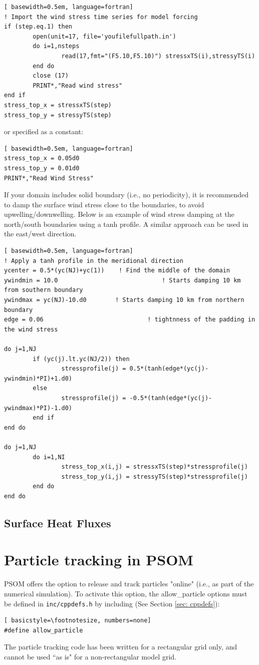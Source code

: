 \documentclass[12pt,letterpaper,titlepage]{article}
\begin{document}
\begin{lstlisting}[	basewidth=0.5em, language=fortran]
! Import the wind stress time series for model forcing
if (step.eq.1) then
		open(unit=17, file='youfilefullpath.in')
		do i=1,nsteps
				read(17,fmt="(F5.10,F5.10)") stressxTS(i),stressyTS(i)
		end do
		close (17)
		PRINT*,"Read wind stress"
end if
stress_top_x = stressxTS(step)
stress_top_y = stressyTS(step)
\end{lstlisting}	
or specified as a constant:

\begin{lstlisting}[	basewidth=0.5em, language=fortran]
stress_top_x = 0.05d0
stress_top_y = 0.01d0
PRINT*,"Read Wind Stress"
\end{lstlisting}	

If your domain includes solid boundary (i.e., no periodicity), it is recommended to damp the surface wind stress close to the boundaries, to avoid upwelling/downwelling. Below is an example of wind stress damping at the north/south boundaries using a tanh profile. A similar approach can be used in the east/west direction.

\begin{lstlisting}[	basewidth=0.5em, language=fortran]
! Apply a tanh profile in the meridional direction
ycenter = 0.5*(yc(NJ)+yc(1))	! Find the middle of the domain
ywindmin = 10.0 							! Starts damping 10 km from southern boundary
ywindmax = yc(NJ)-10.d0   	   ! Starts damping 10 km from northern boundary
edge = 0.06    							! tightnness of the padding in the wind stress

do j=1,NJ
		if (yc(j).lt.yc(NJ/2)) then
				stressprofile(j) = 0.5*(tanh(edge*(yc(j)-ywindmin)*PI)+1.d0)
		else
				stressprofile(j) = -0.5*(tanh(edge*(yc(j)-ywindmax)*PI)-1.d0)
		end if
end do

do j=1,NJ
		do i=1,NI
				stress_top_x(i,j) = stressxTS(step)*stressprofile(j)
				stress_top_y(i,j) = stressyTS(step)*stressprofile(j)
		end do
end do
\end{lstlisting}	

\subsection{Surface Heat Fluxes}

\section{Particle tracking in PSOM}
PSOM offers the option to release and track particles "online" (i.e., as part of the numerical simulation). To activate this option, the allow\_particle options must be defined in \texttt{inc/cppdefs.h} by including (See Section \ref{sec: cppdefs}):
\begin{lstlisting}[	basicstyle=\footnotesize, numbers=none]
#define allow_particle
\end{lstlisting}
The particle tracking code has been written for a rectangular grid only, and cannot be used ``as is" for a non-rectangular model grid.
\end{document}
